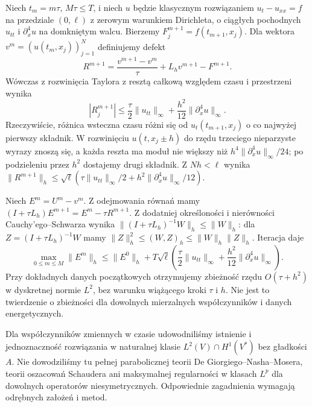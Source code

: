 \begin{uwaga}
Niech $t_m=m\tau$, $M\tau\le T$, i niech $u$ będzie
klasycznym rozwiązaniem $u_t-u_{xx}=f$ na przedziale
$(0,\ell)$ z zerowym warunkiem Dirichleta, o ciągłych
pochodnych $u_{tt}$ i $\partial_x^4u$ na domkniętym
walcu. Bierzemy $F_j^{m+1}=f(t_{m+1},x_j)$.
Dla wektora $v^m=(u(t_m,x_j))_{j=1}^N$
definiujemy defekt
\[
 R^{m+1}=\frac{v^{m+1}-v^m}{\tau}
          +L_hv^{m+1}-F^{m+1}.
\]
Wówczas z rozwinięcia Taylora z resztą całkową
względem czasu i przestrzeni wynika
\[
 |R_j^{m+1}|
 \le \frac{\tau}{2}\|u_{tt}\|_\infty
      +\frac{h^2}{12}\|\partial_x^4 u\|_\infty.
\]
Rzeczywiście, różnica wsteczna czasu różni się
od $u_t(t_{m+1},x_j)$ o co najwyżej pierwszy
składnik. W rozwinięciu $u(t,x_j\pm h)$ do rzędu
trzeciego nieparzyste wyrazy znoszą się, a każda
reszta ma moduł nie większy niż
$h^4\|\partial_x^4u\|_\infty/24$; po podzieleniu
przez $h^2$ dostajemy drugi składnik.
Z $Nh<\ell$ wynika
$\|R^{m+1}\|_h\le\sqrt{\ell}(
\tau\|u_{tt}\|_\infty/2+h^2\|\partial_x^4u\|_\infty/12)$.

Niech $E^m=U^m-v^m$. Z odejmowania równań mamy
$(I+\tau L_h)E^{m+1}=E^m-\tau R^{m+1}$.
Z dodatniej określoności i nierówności
Cauchy'ego--Schwarza wynika
$\|(I+\tau L_h)^{-1}W\|_h\le\|W\|_h$:
dla $Z=(I+\tau L_h)^{-1}W$ mamy
$\|Z\|_h^2\le(W,Z)_h\le\|W\|_h\|Z\|_h$.
Iteracja daje
\[
 \max_{0\le m\le M}\|E^m\|_h
 \le\|E^0\|_h+T\sqrt{\ell}
 \left(\frac{\tau}{2}\|u_{tt}\|_\infty
       +\frac{h^2}{12}\|\partial_x^4u\|_\infty\right).
\]
Przy dokładnych danych początkowych otrzymujemy
zbieżność rzędu $O(\tau+h^2)$ w dyskretnej normie
$L^2$, bez warunku wiążącego kroki $\tau$ i $h$.
Nie jest to twierdzenie o zbieżności dla dowolnych
mierzalnych współczynników i danych energetycznych.
\end{uwaga}

\begin{uwaga}
Dla współczynników zmiennych w czasie udowodniliśmy
istnienie i jednoznaczność rozwiązania w naturalnej klasie
$L^2(V)\cap H^1(V^*)$ bez gładkości $A$. Nie dowodziliśmy
tu pełnej parabolicznej teorii De Giorgiego--Nasha--Mosera,
teorii oszacowań Schaudera ani maksymalnej regularności
w klasach $L^p$ dla dowolnych operatorów niesymetrycznych.
Odpowiednie zagadnienia wymagają odrębnych założeń i metod.
\end{uwaga}

